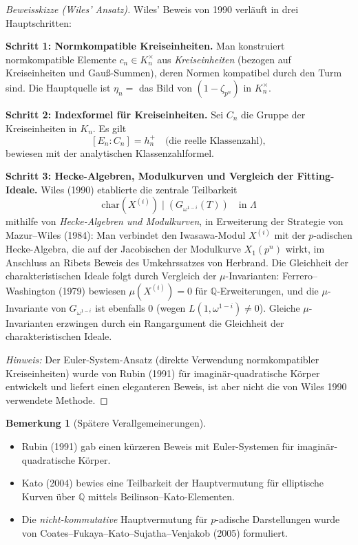 \documentclass[12pt,a4paper]{amsart}
\theoremstyle{definition}
\newtheorem{remark}[theorem]{Bemerkung}
\newcommand{\Q}{\mathbb{Q}}
\begin{document}
\begin{proof}[Beweisskizze (Wiles' Ansatz)]
Wiles' Beweis von 1990 verläuft in drei Hauptschritten:

\textbf{Schritt 1: Normkompatible Kreiseinheiten.}
Man konstruiert normkompatible Elemente $c_n \in K_n^\times$ aus
\emph{Kreiseinheiten} (bezogen auf Kreiseinheiten und Gauß-Summen),
deren Normen kompatibel durch den Turm sind.
Die Hauptquelle ist $\eta_n = $ das Bild von $(1 - \zeta_{p^n})$ in $K_n^\times$.

\textbf{Schritt 2: Indexformel für Kreiseinheiten.}
Sei $C_n$ die Gruppe der Kreiseinheiten in $K_n$.  Es gilt
\[
  [E_n : C_n] = h_n^+ \quad\text{(die reelle Klassenzahl)},
\]
bewiesen mit der analytischen Klassenzahlformel.

\textbf{Schritt 3: Hecke-Algebren, Modulkurven und Vergleich der Fitting-Ideale.}
Wiles (1990) etablierte die zentrale Teilbarkeit
\[
  \mathrm{char}(X^{(i)}) \mid (G_{\omega^{1-i}}(T)) \quad \text{in } \Lambda
\]
mithilfe von \emph{Hecke-Algebren und Modulkurven}, in Erweiterung der Strategie
von Mazur--Wiles (1984): Man verbindet den Iwasawa-Modul $X^{(i)}$ mit der
$p$-adischen Hecke-Algebra, die auf der Jacobischen der Modulkurve $X_1(p^n)$
wirkt, im Anschluss an Ribets Beweis des Umkehrssatzes von Herbrand.
Die Gleichheit der charakteristischen Ideale folgt durch Vergleich der
$\mu$-Invarianten: Ferrero--Washington (1979) bewiesen $\mu(X^{(i)}) = 0$
für $\Q$-Erweiterungen, und die $\mu$-Invariante von $G_{\omega^{1-i}}$
ist ebenfalls $0$ (wegen $L(1, \omega^{1-i}) \ne 0$).  Gleiche $\mu$-Invarianten
erzwingen durch ein Rangargument die Gleichheit der charakteristischen Ideale.

\textit{Hinweis:} Der Euler-System-Ansatz (direkte Verwendung normkompatibler
Kreiseinheiten) wurde von Rubin (1991) für imaginär-quadratische Körper entwickelt
und liefert einen eleganteren Beweis, ist aber nicht die von Wiles 1990 verwendete Methode.
\end{proof}

\begin{remark}[Spätere Verallgemeinerungen]
\begin{itemize}
  \item Rubin (1991) gab einen kürzeren Beweis mit Euler-Systemen für
    imaginär-quadratische Körper.
  \item Kato (2004) bewies eine Teilbarkeit der Hauptvermutung für
    elliptische Kurven über $\Q$ mittels Beilinson--Kato-Elementen.
  \item Die \emph{nicht-kommutative} Hauptvermutung für $p$-adische
    Darstellungen wurde von Coates--Fukaya--Kato--Sujatha--Venjakob (2005)
    formuliert.
\end{itemize}
\end{remark}
\end{document}
